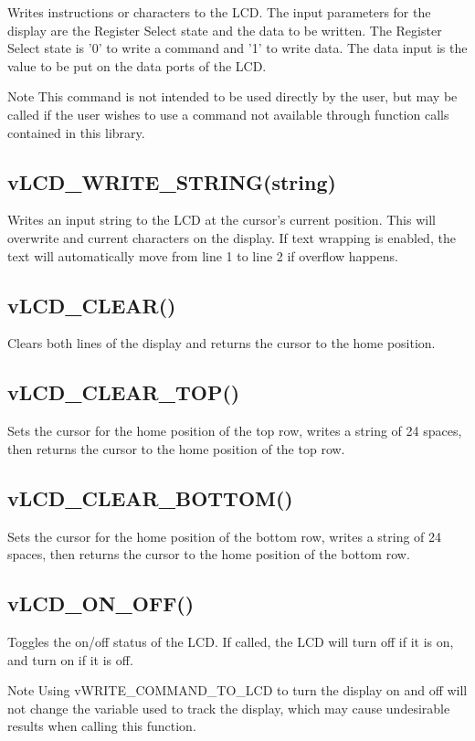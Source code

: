 Writes instructions or characters to the L\-C\-D. The input parameters for the display are the Register Select state and the data to be written. The Register Select state is '0' to write a command and '1' to write data. The data input is the value to be put on the data ports of the L\-C\-D. \begin{DoxyNote}{Note}
This command is not intended to be used directly by the user, but may be called if the user wishes to use a command not available through function calls contained in this library.
\end{DoxyNote}
\hypertarget{_usage_write_string}{}\subsection{v\-L\-C\-D\-\_\-\-W\-R\-I\-T\-E\-\_\-\-S\-T\-R\-I\-N\-G(string)}\label{_usage_write_string}
Writes an input string to the L\-C\-D at the cursor's current position. This will overwrite and current characters on the display. If text wrapping is enabled, the text will automatically move from line 1 to line 2 if overflow happens.\hypertarget{_usage_clear}{}\subsection{v\-L\-C\-D\-\_\-\-C\-L\-E\-A\-R()}\label{_usage_clear}
Clears both lines of the display and returns the cursor to the home position.\hypertarget{_usage_clear_top}{}\subsection{v\-L\-C\-D\-\_\-\-C\-L\-E\-A\-R\-\_\-\-T\-O\-P()}\label{_usage_clear_top}
Sets the cursor for the home position of the top row, writes a string of 24 spaces, then returns the cursor to the home position of the top row.\hypertarget{_usage_clear_bottom}{}\subsection{v\-L\-C\-D\-\_\-\-C\-L\-E\-A\-R\-\_\-\-B\-O\-T\-T\-O\-M()}\label{_usage_clear_bottom}
Sets the cursor for the home position of the bottom row, writes a string of 24 spaces, then returns the cursor to the home position of the bottom row.\hypertarget{_usage_onoff}{}\subsection{v\-L\-C\-D\-\_\-\-O\-N\-\_\-\-O\-F\-F()}\label{_usage_onoff}
Toggles the on/off status of the L\-C\-D. If called, the L\-C\-D will turn off if it is on, and turn on if it is off. \begin{DoxyNote}{Note}
Using v\-W\-R\-I\-T\-E\-\_\-\-C\-O\-M\-M\-A\-N\-D\-\_\-\-T\-O\-\_\-\-L\-C\-D to turn the display on and off will not change the variable used to track the display, which may cause undesirable results when calling this function.
\end{DoxyNote}
